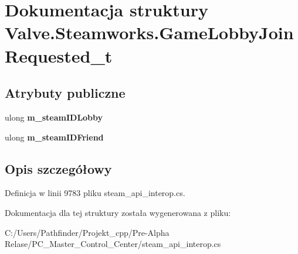 \hypertarget{struct_valve_1_1_steamworks_1_1_game_lobby_join_requested__t}{}\section{Dokumentacja struktury Valve.\+Steamworks.\+Game\+Lobby\+Join\+Requested\+\_\+t}
\label{struct_valve_1_1_steamworks_1_1_game_lobby_join_requested__t}
\subsection*{Atrybuty publiczne}
\begin{DoxyCompactItemize}
\item 
\mbox{\label{struct_valve_1_1_steamworks_1_1_game_lobby_join_requested__t_a780f85949e5790a199d1068d0f69185c}} 
ulong {\bfseries m\+\_\+steam\+I\+D\+Lobby}
\item 
\mbox{\label{struct_valve_1_1_steamworks_1_1_game_lobby_join_requested__t_af5a683b86e9be0936e75567ce0fbeadb}} 
ulong {\bfseries m\+\_\+steam\+I\+D\+Friend}
\end{DoxyCompactItemize}


\subsection{Opis szczegółowy}


Definicja w linii 9783 pliku steam\+\_\+api\+\_\+interop.\+cs.



Dokumentacja dla tej struktury została wygenerowana z pliku\+:\begin{DoxyCompactItemize}
\item 
C\+:/\+Users/\+Pathfinder/\+Projekt\+\_\+cpp/\+Pre-\/\+Alpha Relase/\+P\+C\+\_\+\+Master\+\_\+\+Control\+\_\+\+Center/steam\+\_\+api\+\_\+interop.\+cs\end{DoxyCompactItemize}
